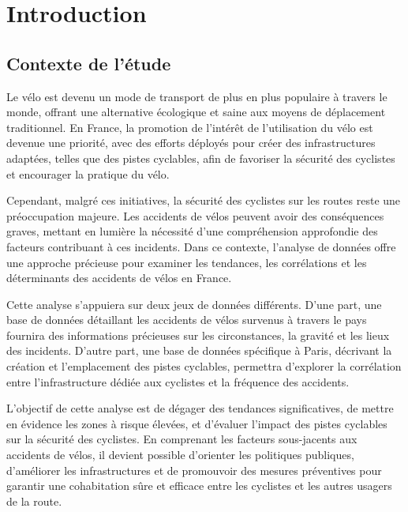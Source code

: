 \documentclass[french,]{compterendu}
\theoremstyle{urcastyle}
\theoremstyle{remark}
\begin{document}
\vspace{1cm}

  {
  \hypersetup{linkcolor=black}
  \setcounter{tocdepth}{2}
  \pagebreak
  \tableofcontents
  }

\pagebreak
\normalsize



\hypertarget{introduction}{%
\section{Introduction}\label{introduction}}

\hypertarget{contexte-de-luxe9tude}{%
\subsection{Contexte de l'étude}\label{contexte-de-luxe9tude}}

Le vélo est devenu un mode de transport de plus en plus populaire à travers le monde, offrant une alternative écologique et saine aux moyens de déplacement traditionnel. En France, la promotion de l'intérêt de l'utilisation du vélo est devenue une priorité, avec des efforts déployés pour créer des infrastructures adaptées, telles que des pistes cyclables, afin de favoriser la sécurité des cyclistes et encourager la pratique du vélo.

Cependant, malgré ces initiatives, la sécurité des cyclistes sur les routes reste une préoccupation majeure. Les accidents de vélos peuvent avoir des conséquences graves, mettant en lumière la nécessité d'une compréhension approfondie des facteurs contribuant à ces incidents. Dans ce contexte, l'analyse de données offre une approche précieuse pour examiner les tendances, les corrélations et les déterminants des accidents de vélos en France.

Cette analyse s'appuiera sur deux jeux de données différents. D'une part, une base de données détaillant les accidents de vélos survenus à travers le pays fournira des informations précieuses sur les circonstances, la gravité et les lieux des incidents. D'autre part, une base de données spécifique à Paris, décrivant la création et l'emplacement des pistes cyclables, permettra d'explorer la corrélation entre l'infrastructure dédiée aux cyclistes et la fréquence des accidents.

L'objectif de cette analyse est de dégager des tendances significatives, de mettre en évidence les zones à risque élevées, et d'évaluer l'impact des pistes cyclables sur la sécurité des cyclistes. En comprenant les facteurs sous-jacents aux accidents de vélos, il devient possible d'orienter les politiques publiques, d'améliorer les infrastructures et de promouvoir des mesures préventives pour garantir une cohabitation sûre et efficace entre les cyclistes et les autres usagers de la route.
\end{document}

